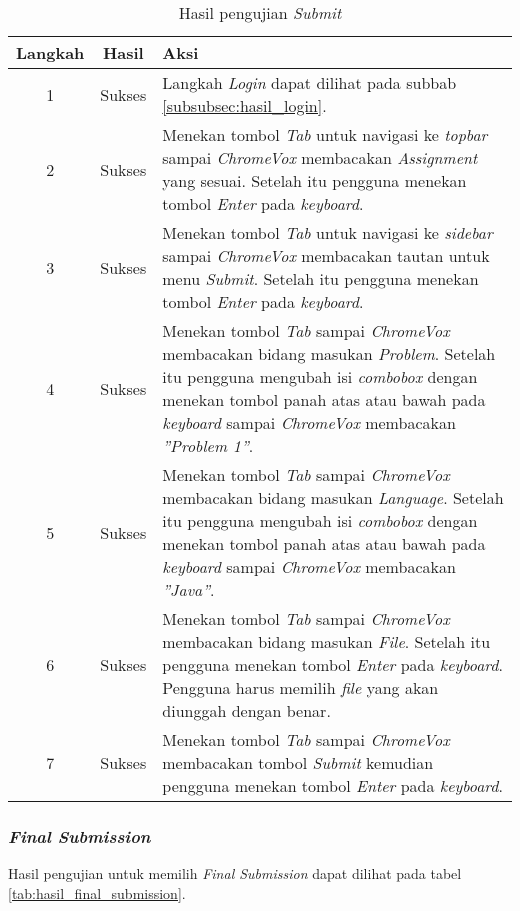 \begin{table}[H]
	\centering
	\caption{Hasil pengujian \textit{Submit}}
	\label{tab:hasil_submit}
	\begin{tabular}{|c|c|p{12cm}|}
		\toprule
		Langkah & Hasil & Aksi\\
		\midrule
		1 & Sukses & Langkah \textit{Login} dapat dilihat pada subbab \ref{subsubsec:hasil_login}.\\
		2 & Sukses & Menekan tombol \textit{Tab} untuk navigasi ke \textit{topbar} sampai \textit{ChromeVox} membacakan \textit{Assignment} yang sesuai. Setelah itu pengguna menekan tombol \textit{Enter} pada \textit{keyboard}.\\
		3 & Sukses & Menekan tombol \textit{Tab} untuk navigasi ke \textit{sidebar} sampai \textit{ChromeVox} membacakan tautan untuk menu \textit{Submit}. Setelah itu pengguna menekan tombol \textit{Enter} pada \textit{keyboard}.\\
		4 & Sukses & Menekan tombol \textit{Tab} sampai \textit{ChromeVox} membacakan bidang masukan \textit{Problem}. Setelah itu pengguna mengubah isi \textit{combobox} dengan menekan tombol panah atas atau bawah pada \textit{keyboard} sampai \textit{ChromeVox} membacakan \textit{''Problem 1''}.\\
		5 & Sukses & Menekan tombol \textit{Tab} sampai \textit{ChromeVox} membacakan bidang masukan \textit{Language}. Setelah itu pengguna mengubah isi \textit{combobox} dengan menekan tombol panah atas atau bawah pada \textit{keyboard} sampai \textit{ChromeVox} membacakan \textit{''Java''}.\\
		6 & Sukses & Menekan tombol \textit{Tab} sampai \textit{ChromeVox} membacakan bidang masukan \textit{File}. Setelah itu pengguna menekan tombol \textit{Enter} pada \textit{keyboard}. Pengguna harus memilih \textit{file} yang akan diunggah dengan benar.\\
		7 & Sukses & Menekan tombol \textit{Tab} sampai \textit{ChromeVox} membacakan tombol \textit{Submit} kemudian pengguna menekan tombol \textit{Enter} pada \textit{keyboard}.\\
		\bottomrule
	\end{tabular}
\end{table}

\subsubsection{\textit{Final Submission}}
\label{subsubsec:hasil_final_submission}
Hasil pengujian untuk memilih \textit{Final Submission} dapat dilihat pada tabel \ref{tab:hasil_final_submission}.

